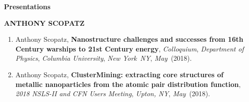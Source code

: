 \documentclass[prl,tighten,amsmath,amssymb,floatfix]{revtex4-1}
\begin{document}
\textbf{Presentations}

\textbf{ANTHONY SCOPATZ}
\vskip 12pt

\begin{enumerate}

\item Anthony Scopatz, {\bf Nanostructure challenges and successes from 16th Century warships to 21st Century energy},
{\it Colloquium},
{\it Department of Physics},
{\it Columbia University},
{\it New York}\
{\it NY},
{\it May}\
(2018).

\item Anthony Scopatz, {\bf ClusterMining: extracting core structures of metallic nanoparticles from the atomic pair distribution function},
{\it 2018 NSLS-II and CFN Users Meeting},
{\it Upton, NY},
{\it May}\
(2018).

\end{enumerate}
\end{document}
